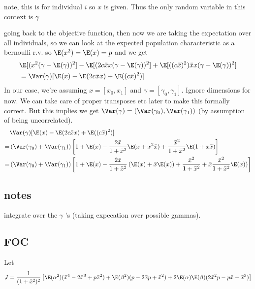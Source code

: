 
note, this is for individual $i$ so $x$ is given. Thus the only random variable in this context is $\gamma$

going back to the objective function, then now we are taking the expectation over all individuals, so we can look at the expected population characteristic as a bernoulli r.v. so
$\E(x^2) = \E(x) = p$ and we get
 \begin{align*}
	 &\E[ ( x^2 (\gamma - \E(\gamma))^2]  - \E[ ( 2 c \bar{x}x (\gamma - \E(\gamma))^2] + \E[ ( (c \bar{x})^2) \bar{x}x (\gamma - \E(\gamma))^2] \\
	 &= \Var(\gamma) [\E(x) - \E(2c\bar{x} x) + \E((c\bar{x})^2)]
\end{align*} 
In our case, we're assuming $x=[x_0, x_1]$ and  $\gamma = [\gamma_0, \gamma_1]$. Ignore dimensions for now. We can take care of proper transposes etc later to make this formally correct. But this implies we get $\Var(\gamma) = (\Var(\gamma_0), \Var(\gamma_1))$ (by assumption of being uncorrelated).
\begin{align*}
	  &\Var(\gamma) [\E(x) - \E(2c\bar{x} x) + \E((c\bar{x})^2)] \\
	= &\left( \Var(\gamma_0) + \Var(\gamma_1) \right)\left[1 + \E(x) - \frac{2\bar{x}}{1 + \bar{x}^2} \E(x + x^2 \bar{x}) + \frac{\bar{x}^2}{1 + \bar{x}^2} \E(1 + x \bar{x}) \right] \\
	= &\left( \Var(\gamma_0) + \Var(\gamma_1) \right)\left[1 + \E(x) - \frac{2\bar{x}}{1 + \bar{x}^2} \left(\E(x) +  \bar{x}\E(x)\right) + \frac{\bar{x}^2}{1 + \bar{x}^2} + \bar{x}\frac{\bar{x}^2}{1 + \bar{x}^2} \E(x) ) \right] \\
\end{align*} 


\subsection*{notes}
integrate over the $\gamma$ 's (taking expecation over possible gammas).



\subsection*{FOC}
Let 
\begin{align*}
	J = \frac{1}{(1+\bar{x}^2)^2} \left[ \E(\alpha^2)(\bar{x}^4 - 2\bar{x}^3 + p \bar{x}^2)
+ \E(\beta^2) ( p - 2 \bar{x} p + \bar{x}^2) + 2 \E(\alpha)\E(\beta)(2 \bar{x}^2 p - p \bar{x} - \bar{x}^3) \right]
\end{align*} 

